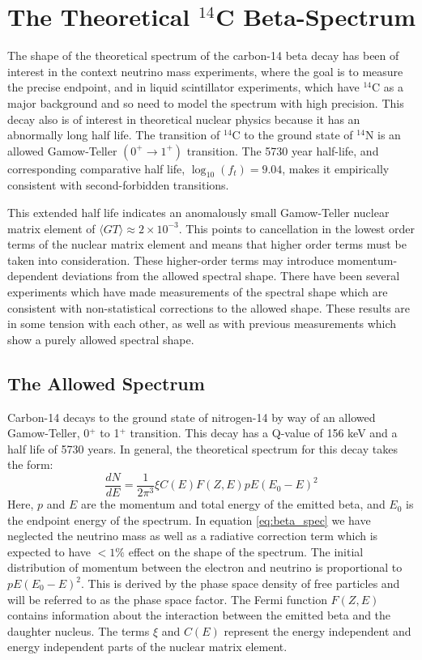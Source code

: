 \section{The Theoretical $^{14}$C Beta-Spectrum}\label{sec:c14spec}
The shape of the theoretical spectrum of the carbon-14 beta decay has been of interest in the context neutrino mass experiments\cite{C14_Wietfeldt}, where the goal is to measure the precise endpoint, and in liquid scintillator experiments, which have $^{14}$C as a major background and so need to model the spectrum with high precision\cite{C14_Borexino, C14_Bergeron}. This  decay also is of interest in theoretical nuclear physics because it has an abnormally long half life\cite{C14_Kuzminov,C14_Genz,C14_Garcia}. The transition of $^{14}$C to the ground state of $^{14}$N is an allowed Gamow-Teller $(0^+ \rightarrow 1^+)$ transition. The 5730 year half-life, and corresponding comparative half life, $\log_{10}(f_t)=9.04$, makes it empirically consistent with second-forbidden transitions\cite{C14_Kuzminov,C14_Wietfeldt}.

This extended half life indicates an anomalously small Gamow-Teller nuclear matrix element of $\langle GT \rangle \approx 2 \times 10^{-3}$. This points to cancellation in the lowest order terms of the nuclear matrix element and means that higher order terms must be taken into consideration. These higher-order terms may introduce momentum-dependent deviations from the allowed spectral shape. There have been several experiments\cite{C14_Sonntag, C14_Wietfeldt, C14_Borexino, C14_Kuzminov, C14_Bergeron} which have made measurements of the spectral shape which are consistent with non-statistical corrections to the allowed shape. These results are in some tension with each other, as well as with previous measurements which show a purely allowed spectral shape\cite{C14_Curran}. 

\subsection{The Allowed Spectrum}
Carbon-14 decays to the ground state of nitrogen-14 by way of an allowed Gamow-Teller, 0$^+$ to 1$^+$ transition. This decay has a Q-value of 156 keV and a half life of 5730 years. In general, the theoretical spectrum for this decay takes the form\cite{C14_Kuzminov}:
\begin{equation}\label{eq:beta_spec}
\frac{dN}{dE}=\frac{1}{2\pi^3} \xi C(E) F(Z,E) pE(E_0-E)^2
\end{equation}
Here, $p$ and $E$ are the momentum and total energy of the emitted beta, and $E_0$ is the endpoint energy of the spectrum. In equation \ref{eq:beta_spec} we have neglected the neutrino mass as well as a radiative correction term which is expected to have $<1\%$ effect on the shape of the spectrum\cite{C14_Wietfeldt}. The initial distribution of momentum between the electron and neutrino is proportional to $pE(E_0-E)^2$. This is derived by the phase space density of free particles and will be referred to as the phase space factor. The Fermi function $F(Z,E)$ contains information about the interaction between the emitted beta and the daughter nucleus. The terms $\xi$ and  $C(E)$ represent the energy independent and energy independent parts of the nuclear matrix element.


